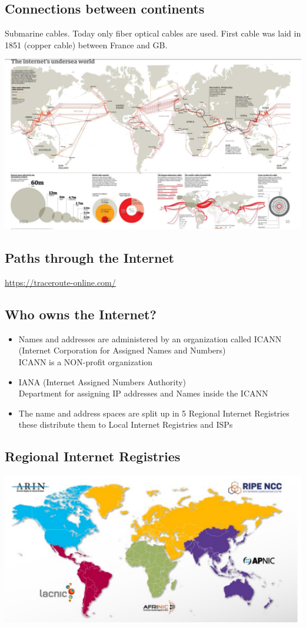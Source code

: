 \documentclass[11pt]{article}
\begin{document}
\subsection{Connections between continents}
Submarine cables.
Today only fiber optical cables are used.
\@ First cable was laid in 1851 (copper cable) between France and GB.\@

\includegraphics[width=\textwidth]{internet-connections}
\subsection{Paths through the Internet}
\url{https://traceroute-online.com/}
\subsection{Who owns the Internet?}
    \begin{itemize}
        \item Names and addresses are administered by an organization called ICANN (Internet Corporation for Assigned Names and Numbers) \\
        ICANN is a NON-profit organization
        \item IANA (Internet Assigned Numbers Authority) \\
        Department for assigning IP addresses and Names inside the ICANN
        \item The name and address spaces are split up in 5 Regional Internet Registries \\
        these distribute them to Local Internet Registries and ISPs
    \end{itemize}
\subsection{Regional Internet Registries}
\includegraphics[width=\textwidth]{regional-internet-registries}
\end{document}
